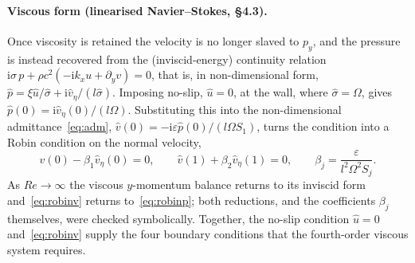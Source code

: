 \documentclass[11pt]{article}
\begin{document}
\paragraph{Viscous form (linearised Navier--Stokes, \S4.3).} Once viscosity is retained the velocity is
no longer slaved to $p_y$, and the pressure is instead recovered from the (inviscid-energy) continuity
relation $\mathrm{i}\sigma\,p+\rho c^2(-\mathrm{i}k_xu+\partial_yv)=0$, that is, in non-dimensional form,
$\hat p=\xi\hat u/\hat\sigma+\mathrm{i}\hat v_\eta/(l\hat\sigma)$. Imposing no-slip, $\hat u=0$, at the
wall, where $\hat\sigma=\Omega$, gives $\hat p(0)=\mathrm{i}\hat v_\eta(0)/(l\Omega)$. Substituting this
into the non-dimensional admittance~\eqref{eq:adm}, $\hat v(0)=-\mathrm{i}\varepsilon\hat p(0)/(l\Omega
S_1)$, turns the condition into a Robin condition on the normal velocity,
\begin{equation}
\hat v(0)-\beta_1\hat v_\eta(0)=0,\qquad \hat v(1)+\beta_2\hat v_\eta(1)=0,\qquad
\beta_j=\frac{\varepsilon}{l^2\Omega^2S_j}.
\label{eq:robinv}
\end{equation}
As $Re\to\infty$ the viscous $y$-momentum balance returns to its inviscid form and~\eqref{eq:robinv}
returns to~\eqref{eq:robinp}; both reductions, and the coefficients $\beta_j$ themselves, were checked
symbolically. Together, the no-slip condition $\hat u=0$ and~\eqref{eq:robinv} supply the four boundary
conditions that the fourth-order viscous system requires.
\end{document}
